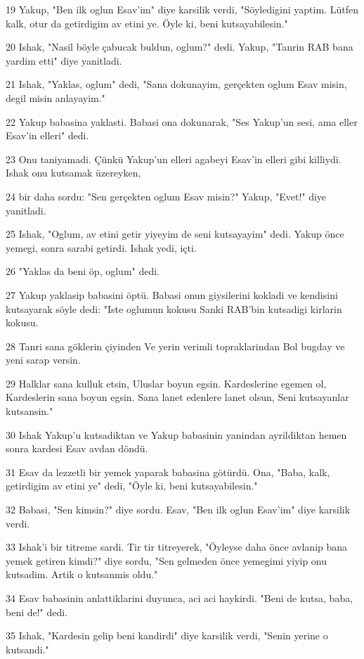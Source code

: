 \par 19 Yakup, "Ben ilk oglun Esav'im" diye karsilik verdi, "Söyledigini yaptim. Lütfen kalk, otur da getirdigim av etini ye. Öyle ki, beni kutsayabilesin."
\par 20 Ishak, "Nasil böyle çabucak buldun, oglum?" dedi. Yakup, "Tanrin RAB bana yardim etti" diye yanitladi.
\par 21 Ishak, "Yaklas, oglum" dedi, "Sana dokunayim, gerçekten oglum Esav misin, degil misin anlayayim."
\par 22 Yakup babasina yaklasti. Babasi ona dokunarak, "Ses Yakup'un sesi, ama eller Esav'in elleri" dedi.
\par 23 Onu taniyamadi. Çünkü Yakup'un elleri agabeyi Esav'in elleri gibi killiydi. Ishak onu kutsamak üzereyken,
\par 24 bir daha sordu: "Sen gerçekten oglum Esav misin?" Yakup, "Evet!" diye yanitladi.
\par 25 Ishak, "Oglum, av etini getir yiyeyim de seni kutsayayim" dedi. Yakup önce yemegi, sonra sarabi getirdi. Ishak yedi, içti.
\par 26 "Yaklas da beni öp, oglum" dedi.
\par 27 Yakup yaklasip babasini öptü. Babasi onun giysilerini kokladi ve kendisini kutsayarak söyle dedi: "Iste oglumun kokusu Sanki RAB'bin kutsadigi kirlarin kokusu.
\par 28 Tanri sana göklerin çiyinden Ve yerin verimli topraklarindan Bol bugday ve yeni sarap versin.
\par 29 Halklar sana kulluk etsin, Uluslar boyun egsin. Kardeslerine egemen ol, Kardeslerin sana boyun egsin. Sana lanet edenlere lanet olsun, Seni kutsayanlar kutsansin."
\par 30 Ishak Yakup'u kutsadiktan ve Yakup babasinin yanindan ayrildiktan hemen sonra kardesi Esav avdan döndü.
\par 31 Esav da lezzetli bir yemek yaparak babasina götürdü. Ona, "Baba, kalk, getirdigim av etini ye" dedi, "Öyle ki, beni kutsayabilesin."
\par 32 Babasi, "Sen kimsin?" diye sordu. Esav, "Ben ilk oglun Esav'im" diye karsilik verdi.
\par 33 Ishak'i bir titreme sardi. Tir tir titreyerek, "Öyleyse daha önce avlanip bana yemek getiren kimdi?" diye sordu, "Sen gelmeden önce yemegimi yiyip onu kutsadim. Artik o kutsanmis oldu."
\par 34 Esav babasinin anlattiklarini duyunca, aci aci haykirdi. "Beni de kutsa, baba, beni de!" dedi.
\par 35 Ishak, "Kardesin gelip beni kandirdi" diye karsilik verdi, "Senin yerine o kutsandi."
